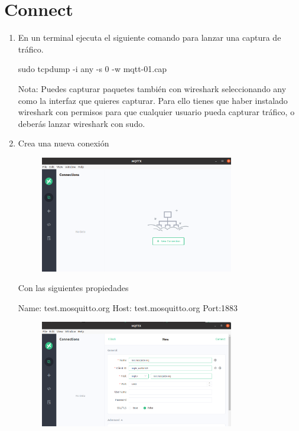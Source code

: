 \documentclass[12pt, a4paper]{report}
\begin{document}
\chapter{Connect}
\begin{enumerate}
	\item En un terminal ejecuta el siguiente comando para lanzar una captura de tráfico.
	\begin{center}
		sudo tcpdump -i any -s 0 -w mqtt-01.cap
	\end{center}
	Nota: Puedes capturar paquetes también con wireshark seleccionando any como la interfaz que
	quieres capturar. Para ello tienes que haber instalado wireshark con permisos para que cualquier
	usuario pueda capturar tráfico, o deberás lanzar wireshark con sudo.
	\item Crea una nueva conexión
	\begin{figure}[H]
		\centering
		\includegraphics[width=0.8\textwidth]{enun6}
	\end{figure}
	Con las siguientes propiedades
	\begin{center}
		Name: test.mosquitto.org
		Host: test.mosquitto.org
		Port:1883
	\end{center}
	\begin{figure}[H]
		\centering
		\includegraphics[width=0.8\textwidth]{enun7}
	\end{figure}

\end{enumerate}
\end{document}

